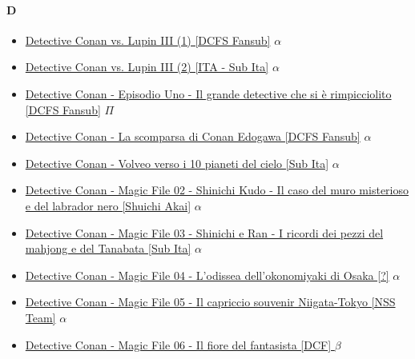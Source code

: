 		\paragraph{D} \hypertarget{SPD}{}
			\begin{itemize}
				
				\item \href{https://mega.nz/#!0QFkARab!5cD7MoQ-AwQKL_l_P8qrsp5Egzz-6OeO3sr7o_pH_Rg} { Detective Conan vs. Lupin III (1) [DCFS Fansub]}  $\alpha$ \\
				\item \href{https://mega.nz/#F!JBE0HTLS!E0QLklLsfxxDLE4P0b4ilg} {Detective Conan vs. Lupin III (2) [ITA - Sub Ita]} $\alpha$  \\
				\item \href{https://mega.nz/#!wXplFbiR!7ajN7kF0ECs1ZCADRNNOC4Xz440fs3E6GVI815zPZPQ} {Detective Conan -  Episodio Uno - Il grande detective che si è rimpicciolito  [DCFS Fansub]}  $\Pi$ \\
				\item \href{https://mega.nz/#!NB1nza7I!2Wq_I7jkdaLIJMfpe4Nei2jzXlnyBQNEJZYAJ05TMHA} {Detective Conan - La scomparsa di Conan Edogawa [DCFS Fansub]} $\alpha$  \\
				\item \href{https://mega.nz/#!IIFgUaIa!-iGEk2SPWo1YCzZ0_MvibjSBi3QRJwUb256Ojmz_Bv4} {Detective Conan - Volveo verso i 10 pianeti del cielo [Sub Ita]} $\alpha$  \\
				\item \href{https://mega.nz/#!IIFgUaIa!-iGEk2SPWo1YCzZ0_MvibjSBi3QRJwUb256Ojmz_Bv4} {Detective Conan - Magic File 02 - Shinichi Kudo - Il caso del muro misterioso e del labrador nero [Shuichi Akai]} $\alpha$  \\
				\item \href{https://mega.nz/#!IIFgUaIa!-iGEk2SPWo1YCzZ0_MvibjSBi3QRJwUb256Ojmz_Bv4} {Detective Conan - Magic File 03 - Shinichi e Ran - I ricordi dei pezzi del mahjong e del Tanabata [Sub Ita]} $\alpha$  \\
				\item \href{https://mega.nz/#!IIFgUaIa!-iGEk2SPWo1YCzZ0_MvibjSBi3QRJwUb256Ojmz_Bv4} {Detective Conan - Magic File 04 - L'odissea dell'okonomiyaki di Osaka [?]} $\alpha$  \\
				\item \href{https://mega.nz/#!IIFgUaIa!-iGEk2SPWo1YCzZ0_MvibjSBi3QRJwUb256Ojmz_Bv4} {Detective Conan - Magic File 05 - Il capriccio souvenir Niigata-Tokyo [NSS Team]} $\alpha$  \\
				\item \href{https://mega.nz/#!S84iHJwA!hEIygBqFbg6IN1jfAraox9Xvl9OfZs_N7YeAf7yOYCg} {Detective Conan - Magic File 06 - Il fiore del fantasista [DCF] } $\beta$  \\
				
				
				
			\end{itemize}
		
